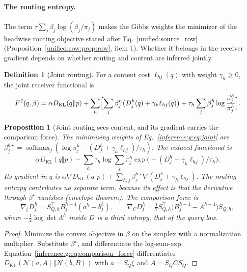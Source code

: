 \documentclass[11pt]{article}
\newtheorem{proposition}[theorem]{Proposition}
\theoremstyle{definition}
\newtheorem{definition}[theorem]{Definition}
\theoremstyle{remark}
\providecommand{\KL}{D_{\mathrm{KL}}}
\providecommand{\softmax}{\operatorname{softmax}}
\providecommand{\N}{\mathcal{N}}
\begin{document}
\paragraph{The routing entropy.}
The term $\tau\sum_j\beta_j\log(\beta_j/\pi_j)$ makes the Gibbs weights the minimizer of the headwise routing objective stated after Eq.~\eqref{unified:source_row} (Proposition~\ref{unified:row:prop:row}, item 1). Whether it belongs in the receiver gradient depends on whether routing and content are inferred jointly.

\begin{definition}[Joint routing]
\label{inference:g:def:joint}
For a content cost $\ell_{hj}(q)$ with weight $\gamma_h\ge0$, the joint receiver functional is
\begin{equation}
F^{\mathrm J}(q,\beta)=\alpha\KL(q\Vert p)+\sum_h\Bigl[\sum_j\beta_j^h\bigl(D_{j}^h(q)+\gamma_h\ell_{hj}(q)\bigr)+\tau_h\sum_j\beta_j^h\log\frac{\beta_j^h}{\pi_j^h}\Bigr].
\label{inference:g:eq:joint}
\end{equation}
\end{definition}

\begin{proposition}[Joint routing sees content, and its gradient carries the comparison force]
\label{inference:g:prop:joint}
The minimizing weights of Eq.~\eqref{inference:g:eq:joint} are $\beta_j^{h\star}=\softmax_j(\log\pi_j^h-(D_j^h+\gamma_h\ell_{hj})/\tau_h)$. The reduced functional is
\[
\alpha\KL(q\Vert p)-\sum_h\tau_h\log\sum_j\pi_j^h\exp\bigl(-(D_j^h+\gamma_h\ell_{hj})/\tau_h\bigr).
\]
Its gradient in $q$ is $\alpha\nabla\KL(q\Vert p)+\sum_{h,j}\beta_j^{h\star}\nabla(D_j^h+\gamma_h\ell_{hj})$. The routing entropy contributes no separate term, because its effect is that the derivative through $\beta^\star$ vanishes (envelope theorem). The comparison force is
\begin{equation}
\nabla_\xi D_j^h=S_{Q,h}^\top B_j^{h -1}(a^h-b_j^h),\qquad
\nabla_CD_j^h=\tfrac12S_{Q,h}^\top\bigl(B_j^{h -1}-A^{h -1}\bigr)S_{Q,h},
\label{inference:g:eq:comparison_force}
\end{equation}
where $-\tfrac12\log\det A^h$ inside $D$ is a third entropy, that of the query law.
\end{proposition}

\begin{proof}
Minimize the convex objective in $\beta$ on the simplex with a normalization multiplier. Substitute $\beta^\star$, and differentiate the log-sum-exp. Equation~\eqref{inference:g:eq:comparison_force} differentiates $\KL(\N(a,A)\Vert\N(b,B))$ with $a=S_Q\xi$ and $A=S_QCS_Q^\top$.
\end{proof}
\end{document}
